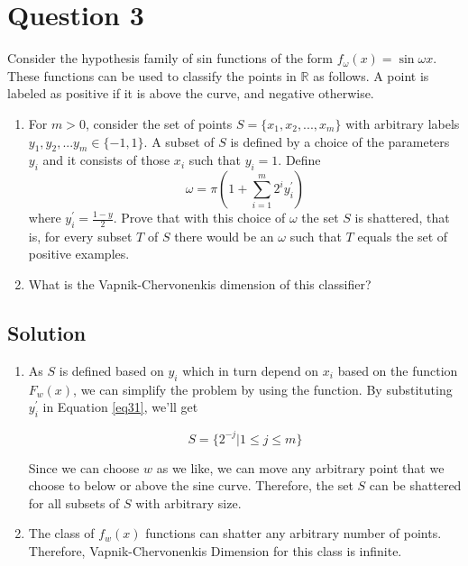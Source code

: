 
\section*{Question 3}

Consider the hypothesis family of sin functions of the form $f_\omega(x) = \sin \omega x$.
These functions can be used to classify the points in $\mathbb{R}$ as follows.
A point is labeled as positive if it is above the curve, and negative otherwise.
\begin{enumerate}[label=(\alph*)]
\item For $m > 0$, consider the set of points $S = \{x_1, x_2, ..., x_m\}$ with arbitrary labels $y_1, y_2, ... y_m \in \{-1, 1\}$.
A subset of $S$ is defined by a choice of the parameters $y_i$ and it consists of those $x_i$ such that $y_i = 1$.
Define
\begin{equation}\label{eq31}
\omega = \pi (1 + \sum_{i=1}^{m} 2^{i}y_{i}^{\prime})
\end{equation}
where $y_i^\prime = \frac{1-y}{2}$.
Prove that with this choice of $\omega$ the set $S$ is shattered, that is, for every subset $T$ of $S$ there would be an $\omega$ such that $T$ equals the set of positive examples.

\item What is the Vapnik-Chervonenkis dimension of this classifier?
\end{enumerate}

\subsection*{Solution}

\begin{enumerate}
\item As $S$ is defined based on $y_i$ which in turn depend on $x_i$ based on the function $F_w(x)$, we can simplify the problem by using the function.
By substituting $y_i^\prime$ in Equation \ref{eq31}, we'll get

\begin{equation}\label{eq32}
S = \{2 ^ {-j} | 1 \leq j \leq m\}
\end{equation}

Since we can choose $w$ as we like, we can move any arbitrary point that we choose to below or above the sine curve.
Therefore, the set $S$ can be shattered for all subsets of $S$ with arbitrary size.

\item The class of $f_w(x)$ functions can shatter any arbitrary number of points.
Therefore, Vapnik-Chervonenkis Dimension for this class is infinite.
\end{enumerate}
